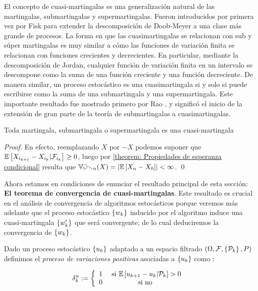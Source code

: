 \begin{remark}
	El concepto de cuasi-martingalas es una generalizaci\'on natural de las martingalas, submartingalas y supermartingalas. Fueron introducidos por primera vez por Fisk \cite{fisk:1965} para extender la descomposici\'on de Doob-Meyer a una clase m\'as grande de procesos. La forma en que las cuasimartingalas se relacionan con sub y s\'uper martingalas es muy similar a c\'omo las funciones de variaci\'on finita se relacionan con funciones crecientes y decrecientes. En particular, mediante la descomposici\'on de Jordan, cualquier funci\'on de variaci\'on finita en un intervalo se descompone como la suma de una funci\'on creciente y una funci\'on decreciente. De manera similar, un proceso estoc\'astico es una cuasimartingala si y solo si puede escribirse como la suma de una submartingala y una supermartingala. Este importante resultado fue mostrado primero por Rao \cite{rao:1969}, y signific\'o el inicio de la extensi\'on de gran parte de la teor\'ia de submartingalas  a cuasimartingalas.
\end{remark}

\begin{proposition}
	Toda martingala, submartingala o supermartingala es una cuasi-martingala
\end{proposition}

\begin{proof}
	En efecto, reemplazando $X$ por $-X$ podemos suponer que $\mathbb{E} \left[X_{i_{k+1}} - X_{i_k} \vert \mathcal{F}_{i_k}\right] \geq 0$, luego por \ref{theorem: Propiedades de esperanza condicional} resulta que $\mathbb{Var}_n(X) = \left\lvert\mathbb{E} \left[X_n - X_0\right]\right\rvert < \infty$. \qed
\end{proof}

Ahora estamos en condiciones de enunciar el resultado principal de esta secci\'on: \textbf{El teorema de convergencia de cuasi-martingalas}. Este resultado es crucial en el an\'alisis de convergencia de algoritmos estoc\'asticos porque veremos m\'as adelante que el proceso estoc\'astico $\left\lbrace w_k\right\rbrace$ inducido por el algoritmo induce una cuasi-martingala $\left\lbrace w_k'\right\rbrace$ que ser\'a convergente; de lo cual deduciremos la convergencia de $\left\lbrace w_k\right\rbrace$.

\begin{definition}
	\label{def: Variaciones positivas de un proceso}
	Dado un proceso estoc\'astico $\left\lbrace u_k\right\rbrace$ adaptado a un espacio filtrado $\left(\Omega, \mathcal{F}, \left\lbrace\mathcal{P}_k\right\rbrace, P\right)$ definimos el \textit{proceso de variaciones positivas} asociadas a $\left\lbrace u_k\right\rbrace$ como :
	
	\begin{equation}
	\delta^u_k := \left\lbrace \begin{array}{cc}
	1 & \text{ si } \mathbb{E} \left[{u_{k+1} - u_k} \vert \mathcal{P}_{k}\right] > 0 \\
	0 & \text{ si no }
	\end{array}\right.
	\end{equation}
	
\end{definition}

